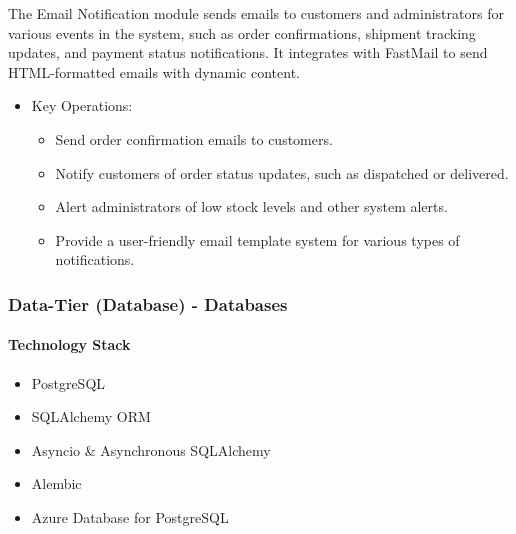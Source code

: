 \documentclass{llncs}
\begin{document}
The Email Notification module sends emails to customers and administrators for various events in the system, such as order confirmations, shipment tracking updates, and payment status notifications. It integrates with FastMail to send HTML-formatted emails with dynamic content.
\begin{itemize}
    \item Key Operations:
    \begin{itemize}   
        \item Send order confirmation emails to customers.
        \item Notify customers of order status updates, such as dispatched or delivered.
        \item Alert administrators of low stock levels and other system alerts.
        \item Provide a user-friendly email template system for various types of notifications.
    \end{itemize}   
\end{itemize}

\subsubsection{Data-Tier (Database) - Databases}
\paragraph{Technology Stack}
\begin{itemize}   
    \item PostgreSQL
    \item SQLAlchemy ORM
    \item Asyncio \& Asynchronous SQLAlchemy
    \item Alembic
    \item Azure Database for PostgreSQL
\end{itemize}   
\end{document}
